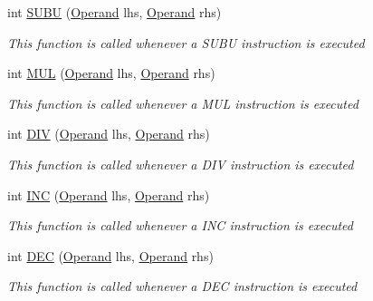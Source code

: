 \begin{DoxyCompactItemize}
int \hyperlink{class_c_p_u___o_s___simulator_1_1_c_p_u_1_1_instruction_a612e041210347726cc65bfa4401af561}{S\+U\+B\+U} (\hyperlink{class_c_p_u___o_s___simulator_1_1_c_p_u_1_1_operand}{Operand} lhs, \hyperlink{class_c_p_u___o_s___simulator_1_1_c_p_u_1_1_operand}{Operand} rhs)
\begin{DoxyCompactList}\small\item\em This function is called whenever a S\+U\+B\+U instruction is executed \end{DoxyCompactList}\item 
int \hyperlink{class_c_p_u___o_s___simulator_1_1_c_p_u_1_1_instruction_a46ba0e257c0a23f35b638cc774c016bd}{M\+U\+L} (\hyperlink{class_c_p_u___o_s___simulator_1_1_c_p_u_1_1_operand}{Operand} lhs, \hyperlink{class_c_p_u___o_s___simulator_1_1_c_p_u_1_1_operand}{Operand} rhs)
\begin{DoxyCompactList}\small\item\em This function is called whenever a M\+U\+L instruction is executed \end{DoxyCompactList}\item 
int \hyperlink{class_c_p_u___o_s___simulator_1_1_c_p_u_1_1_instruction_a45a29c12e7b55d4831705d13460df4a1}{D\+I\+V} (\hyperlink{class_c_p_u___o_s___simulator_1_1_c_p_u_1_1_operand}{Operand} lhs, \hyperlink{class_c_p_u___o_s___simulator_1_1_c_p_u_1_1_operand}{Operand} rhs)
\begin{DoxyCompactList}\small\item\em This function is called whenever a D\+I\+V instruction is executed \end{DoxyCompactList}\item 
int \hyperlink{class_c_p_u___o_s___simulator_1_1_c_p_u_1_1_instruction_a1fd4bf15c81941456405fd7a17ab2962}{I\+N\+C} (\hyperlink{class_c_p_u___o_s___simulator_1_1_c_p_u_1_1_operand}{Operand} lhs, \hyperlink{class_c_p_u___o_s___simulator_1_1_c_p_u_1_1_operand}{Operand} rhs)
\begin{DoxyCompactList}\small\item\em This function is called whenever a I\+N\+C instruction is executed \end{DoxyCompactList}\item 
int \hyperlink{class_c_p_u___o_s___simulator_1_1_c_p_u_1_1_instruction_a9cb36212a7cab42725d8a05f719e732f}{D\+E\+C} (\hyperlink{class_c_p_u___o_s___simulator_1_1_c_p_u_1_1_operand}{Operand} lhs, \hyperlink{class_c_p_u___o_s___simulator_1_1_c_p_u_1_1_operand}{Operand} rhs)
\begin{DoxyCompactList}\small\item\em This function is called whenever a D\+E\+C instruction is executed \end{DoxyCompactList}\item 

\end{DoxyCompactItemize}
